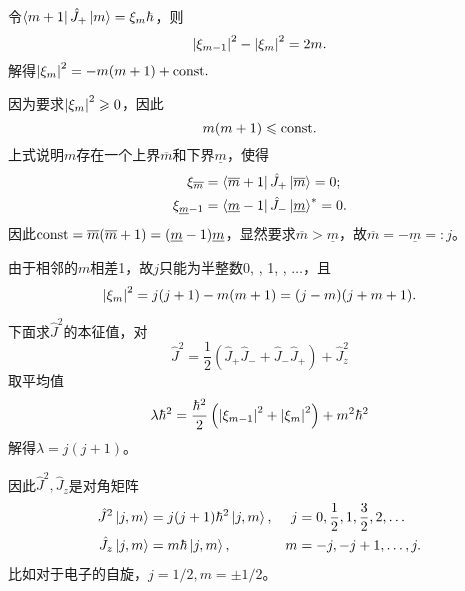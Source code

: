 令$\left\langle m+1\right\vert\hat J_+\left\vert m\right\rangle=\xi_m\hbar$，则 
\[
	\left\lvert\xi_{m-1}\right\rvert^2-\left\lvert\xi_m\right\rvert^2=2m.
\]
解得$\left\lvert\xi_m\right\rvert^2=-m(m+1)+\mathrm{const}.$

因为要求$\left\lvert\xi_m\right\rvert^2\geqslant 0$，因此 
\[
m(m+1)\leqslant\mathrm{const}.
\]
上式说明$m$存在一个上界$\overline m$和下界$\underline m$，使得
\begin{align*}
	\xi_{\overline m}&=\left\langle \overline m+1\right\vert\hat J_+\left\vert \overline m\right\rangle=0;\\
	\xi_{\underline m-1}&=\left\langle \underline m-1\right\vert\hat J_-\left\vert \underline m\right\rangle^\ast=0.
\end{align*}
因此$\mathrm{const}=\overline m(\overline m+1)=(\underline m-1)\underline m$，显然要求$\overline m>\underline m$，故$\overline m=-\underline m=:j$。

由于相邻的$m$相差1，故$j$只能为半整数0, , 1, , $\ldots$，且
\[
	\left\lvert\xi_m\right\rvert^2=j(j+1)-m(m+1)=(j-m)(j+m+1).
\]

下面求$\hat J^2$的本征值，对
\[
	\hat J^2=\frac12(\hat J_+\hat J_-+\hat J_-\hat J_+)+\hat J_z^2
\]
取平均值
\[
	\lambda\hbar^2=\frac{\hbar^2}2\left(\left\lvert\xi_{m-1}\right\rvert^2+\left\lvert\xi_m\right\rvert^2\right)+m^2\hbar^2
\]
解得$\lambda=j(j+1)$。

因此$\hat J^2,\hat J_z$是对角矩阵
\begin{align}
	\hat J^2\left\vert j,m\right\rangle&=j(j+1)\hbar^2\left\vert j,m\right\rangle,&j&=0,\frac12,1,\frac32,2,\ldots\\
	\hat J_z\left\vert j,m\right\rangle&=m\hbar\left\vert j,m\right\rangle,&m&=-j,-j+1,\ldots,j.
\end{align}
比如对于电子的自旋，$j=1/2,m=\pm 1/2$。

